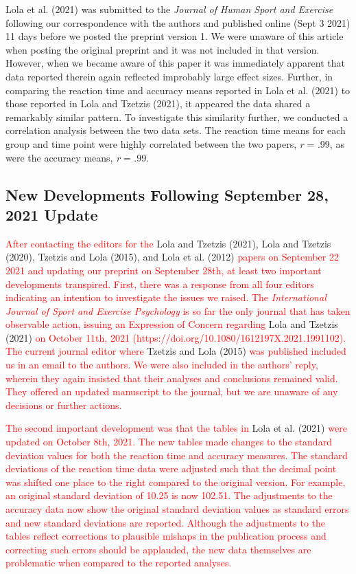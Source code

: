 \documentclass[
  english,
  man, donotrepeattitle,floatsintext]{apa7}
\begin{document}
Lola et al. (2021) was submitted to the \emph{Journal of Human Sport and Exercise} following our correspondence with the authors and published online (Sept 3 2021) 11 days before we posted the preprint version 1. We were unaware of this article when posting the original preprint and it was not included in that version. However, when we became aware of this paper it was immediately apparent that data reported therein again reflected improbably large effect sizes. Further, in comparing the reaction time and accuracy means reported in Lola et al. (2021) to those reported in Lola and Tzetzis (2021), it appeared the data shared a remarkably similar pattern. To investigate this similarity further, we conducted a correlation analysis between the two data sets. The reaction time means for each group and time point were highly correlated between the two papers, \emph{r} = .99, as were the accuracy means, \emph{r} = .99.

\hypertarget{new-developments-following-september-28-2021-update}{%
\subsection{New Developments Following September 28, 2021 Update}\label{new-developments-following-september-28-2021-update}}

\textcolor{red}{After contacting the editors for the} Lola and Tzetzis (2021), Lola and Tzetzis (2020), Tzetzis and Lola (2015), and Lola et al. (2012) \textcolor{red}{papers on September 22 2021 and updating our preprint on September 28th, at least two important developments transpired. First, there was a response from all four editors indicating an intention to investigate the issues we raised. The \emph{International Journal of Sport and Exercise Psychology} is so far the only journal that has taken observable action, issuing an Expression of Concern regarding} Lola and Tzetzis (2021) \textcolor{red}{on October 11th, 2021 (https://doi.org/10.1080/1612197X.2021.1991102). The current journal editor where} Tzetzis and Lola (2015) \textcolor{red}{was published included us in an email to the authors. We were also included in the authors' reply, wherein they again insisted that their analyses and conclusions remained valid. They offered an updated manuscript to the journal, but we are unaware of any decisions or further actions.}

\textcolor{red}{The second important development was that the tables in} Lola et al. (2021) \textcolor{red}{were updated on October 8th, 2021. The new tables made changes to the standard deviation values for both the reaction time and accuracy measures. The standard deviations of the reaction time data were adjusted such that the decimal point was shifted one place to the right compared to the original version. For example, an original standard deviation of 10.25 is now 102.51. The adjustments to the accuracy data now show the original standard deviation values as standard errors and new standard deviations are reported. Although the adjustments to the tables reflect corrections to plausible mishaps in the publication process and correcting such errors should be applauded, the new data themselves are problematic when compared to the reported analyses.}
\end{document}
